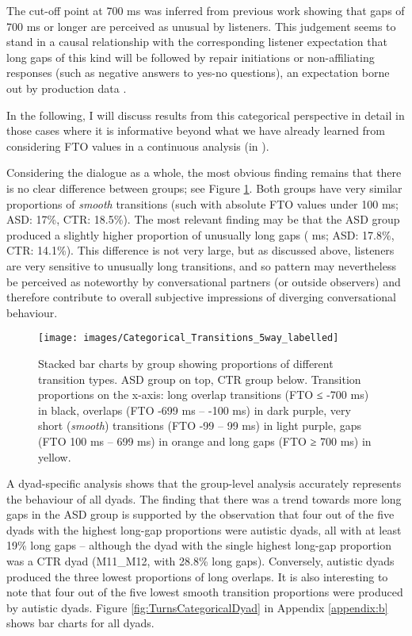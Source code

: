 The cut-off point at 700 ms was inferred from previous work showing that gaps of 700 ms or longer are perceived as unusual by listeners. This judgement seems to stand in a causal relationship with the corresponding listener expectation that long gaps of this kind will be followed by repair initiations or non-affiliating responses (such as negative answers to yes-no questions), an expectation borne out by production data \citep{kendrickIntersectionTurntakingRepair2015, kendrickTimingConstructionPreference2015a, robertsIdentifyingTemporalThreshold2013, schegloffPreferenceSelfcorrectionOrganization1977}.

In the following, I will discuss results from this categorical perspective in detail in those cases where it is informative beyond what we have already learned from considering FTO values in a continuous analysis (in ).

Considering the dialogue as a whole, the most obvious finding remains that there is no clear difference between groups; see Figure \ref{fig:TurnsCategoricalGroupPic}. Both groups have very similar proportions of \textit{smooth} transitions (such with absolute FTO values under 100 ms; ASD: 17\%, CTR: 18.5\%). The most relevant finding may be that the ASD group produced a slightly higher proportion of unusually long gaps ( ms; ASD: 17.8\%, CTR: 14.1\%). This difference is not very large, but as discussed above, listeners are very sensitive to unusually long transitions, and so pattern may nevertheless be perceived as noteworthy by conversational partners (or outside observers) and therefore contribute to overall subjective impressions of diverging conversational behaviour.

\begin{figure}

\texttt{[image: images/Categorical\_Transitions\_5way\_labelled]} \hfill{}

\caption{Stacked bar charts by group showing proportions of different transition types. ASD group on top, CTR group below. Transition proportions on the x-axis: long overlap transitions (FTO ≤ -700 ms) in black, overlaps (FTO -699 ms -- -100 ms) in dark purple, very short (\textit{smooth}) transitions (FTO -99 -- 99 ms) in light purple, gaps (FTO 100 ms -- 699 ms) in orange and long gaps (FTO ≥ 700 ms) in yellow.}\label{fig:TurnsCategoricalGroupPic}
\end{figure}

A dyad-specific analysis shows that the group-level analysis accurately represents the behaviour of all dyads.
The finding that there was a trend towards more long gaps in the ASD group is supported by the observation that four out of the five dyads with the highest long-gap proportions were autistic dyads, all with at least 19\% long gaps -- although the dyad with the single highest long-gap proportion was a CTR dyad (M11\_M12, with 28.8\% long gaps). Conversely, autistic dyads produced the three lowest proportions of long overlaps. It is also interesting to note that four out of the five lowest smooth transition proportions were produced by autistic dyads. Figure \ref{fig:TurnsCategoricalDyad} in Appendix \ref{appendix:b} shows bar charts for all dyads.

